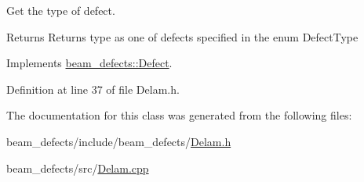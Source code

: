 Get the type of defect. 

\begin{DoxyReturn}{Returns}
Returns type as one of defects specified in the enum Defect\+Type 
\end{DoxyReturn}


Implements \hyperlink{classbeam__defects_1_1_defect_aab237fd856c7ace882ead216c81574e6}{beam\+\_\+defects\+::\+Defect}.



Definition at line 37 of file Delam.\+h.



The documentation for this class was generated from the following files\+:\begin{DoxyCompactItemize}
\item 
beam\+\_\+defects/include/beam\+\_\+defects/\hyperlink{_delam_8h}{Delam.\+h}\item 
beam\+\_\+defects/src/\hyperlink{_delam_8cpp}{Delam.\+cpp}\end{DoxyCompactItemize}
